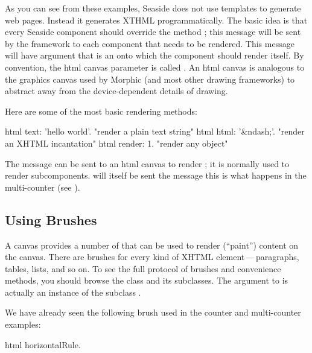 \documentclass[a4paper,10pt,twoside]{book}
\begin{document}
As you can see from these examples, Seaside does not use templates to generate web pages.
Instead it generates XTHML programmatically.
The basic idea is that every Seaside component should override the method ; this message will be sent by the framework to each component that needs to be rendered.
This  message will have argument that is an   onto which the component should render itself.  By convention, the html canvas parameter is called .
An html canvas is analogous to the graphics canvas used by Morphic (and most other drawing frameworks) to abstract away from the device-dependent details of drawing.
 

Here are some of the most basic rendering methods:
\begin{code}{}
html text: 'hello world'.  "render a plain text string"
html html: '&ndash;'.     "render an XHTML incantation"
html render: 1.              "render any object"
\end{code}

The message  can be sent to an html canvas to render ; it is normally used to render subcomponents.   will itself be sent the message 
this is what happens in the multi-counter (see ).

\subsection{Using Brushes}
\label{sec:brushes}

A canvas provides a number of  that can be used to render (\ie ``paint'') content on the canvas.
There are brushes for every kind of XHTML element\,---\,paragraphs, tables, lists, and so on.
To see the full protocol of brushes and convenience methods, you should browse the class  and its subclasses.
The argument to  is actually an instance of the subclass .

We have already seen the following brush used in the counter and multi-counter examples:
\begin{code}{}
html horizontalRule.
\end{code}
\end{document}
